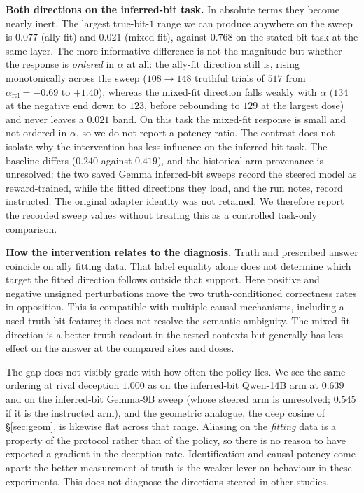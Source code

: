 \documentclass{article}
\begin{document}
\textbf{Both directions on the inferred-bit task.} In absolute terms they become nearly inert. The largest
true-bit-$1$ range we can produce anywhere on the sweep is $0.077$ (ally-fit) and $0.021$ (mixed-fit),
against $0.768$ on the stated-bit task at the same layer. The more informative difference is not the
magnitude but whether the response is \emph{ordered} in $\alpha$ at all: the ally-fit direction still is,
rising monotonically across the sweep ($108 \to 148$ truthful trials of $517$ from
$\alpha_{\mathrm{rel}} = -0.69$ to $+1.40$), whereas the mixed-fit direction falls weakly with $\alpha$
($134$ at the negative end down to $123$, before rebounding to $129$ at the largest dose) and never leaves a
$0.021$ band. On this task the mixed-fit response is small and not ordered in $\alpha$, so we do not report a potency ratio. The contrast does not isolate why the intervention has less influence on the inferred-bit task. The baseline differs ($0.240$ against $0.419$), and the historical arm provenance is unresolved: the two saved Gemma inferred-bit sweeps record the steered model as reward-trained, while the fitted directions they load, and the run notes, record instructed. The original adapter identity was not retained. We therefore report the recorded sweep values without treating this as a controlled task-only comparison.

\textbf{How the intervention relates to the diagnosis.} Truth and prescribed answer coincide on ally fitting data. That label equality alone does not determine which target the fitted direction follows outside that support. Here positive and negative unsigned perturbations move the two truth-conditioned correctness rates in opposition. This is compatible with multiple causal mechanisms, including a used truth-bit feature; it does not resolve the semantic ambiguity. The mixed-fit direction is a better truth readout in the tested contexts but generally has less effect on the answer at the compared sites and doses.

The gap does not visibly grade with how often the policy lies. We see the same ordering at rival deception $1.000$ as on the inferred-bit Qwen-14B arm at
$0.639$ and on the inferred-bit Gemma-9B sweep (whose steered arm is unresolved; $0.545$ if it is the instructed arm), and the geometric analogue, the deep cosine of \S\ref{sec:geom}, is likewise flat across that range. Aliasing on the \emph{fitting} data is a property of
the protocol rather than of the policy, so there is no reason to have expected a gradient in the deception
rate.
Identification and causal potency come apart: the better measurement of truth is the weaker lever on
behaviour in these experiments. This does not diagnose the directions steered in other studies.
\end{document}
